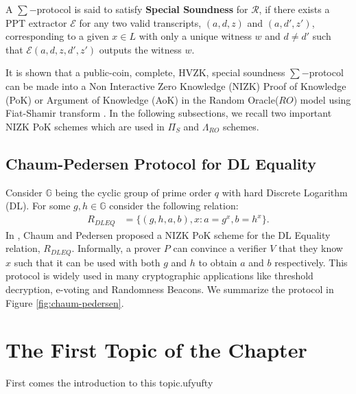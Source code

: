 \begin{definition}
  A $\sum-$protocol is said to satisfy \textbf{Special Soundness} for $\mathcal{R}$, 
  if there exists a PPT extractor $\mathcal{E}$ for any two valid transcripts, $(a,d,z)$ and 
  $(a,d',z')$, corresponding to a given $x\in L$ with only a unique witness $w$ and $d\neq d'$ such that $\mathcal{E}(a,d,z,d',z')$ outputs the 
  witness $w$. 
\end{definition}

It is shown that a public-coin, complete, HVZK, special soundness $\sum-$protocol can be made into a
Non Interactive Zero Knowledge (NIZK) Proof of Knowledge (PoK) or Argument of Knowledge (AoK) in the 
Random Oracle($RO$) model using Fiat-Shamir transform \cite{10.1007/3-540-47721-7_12}. 
In the following subsections, we recall two important NIZK PoK schemes which are used in $\Pi_S$ and 
$\Lambda_{RO}$ schemes.

\subsection{Chaum-Pedersen Protocol for DL Equality}
Consider $\mathbb{G}$ being the cyclic group of prime order $q$ with hard Discrete Logarithm (DL). 
For some $g,h\in \mathbb{G}$ consider the following relation:
\begin{align*}
  R_{DLEQ} &= \{(g,h,a,b),x : a=g^x, b=h^x\}.
\end{align*}
In \cite{10.1007/3-540-48071-4_7}, Chaum and Pedersen proposed a NIZK PoK scheme for the DL Equality 
relation, $R_{DLEQ}$. Informally, a prover $P$ can convince a verifier $V$ that they know $x$ such that
it can be used with both $g$ and $h$ to obtain $a$ and $b$ respectively. This protocol is widely used in
many cryptographic applications like threshold decryption, e-voting and Randomness Beacons. 
We summarize the protocol in Figure \ref{fig:chaum-pedersen}.


\section{The First Topic of the Chapter}
First comes the introduction to this topic.ufyufty

\lipsum[55]

